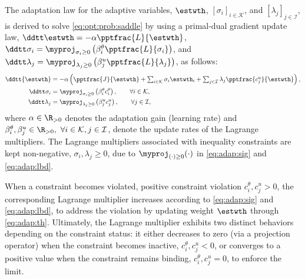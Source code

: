 \documentclass[letterpaper, journal]{IEEEtran}
\begin{document}
The adaptation law for the adaptive variables, $\estwth$, $[\sigma_i]_{i\in\mathcal{K}}$, and $[\lambda_j]_{j\in\mathcal{I}}$, is derived to solve \eqref{eq:opt:prob:saddle} by using a primal-dual gradient update law, \ie 
$
  \ddtt\estwth 
  = 
  -\alpha \pptfrac{L}{\estwth}
$, $
  \ddtt\sigma_i 
  = 
  \myproj_{\sigma_i\ge0}
  \left(
      \beta_i^\theta 
      \pptfrac{L}{\sigma_i}
  \right)
$, and $
  \ddtt\lambda_j 
  = 
  \myproj_{\lambda_j\ge0}
  \left(
    \beta_j^u 
    \pptfrac{L}{\lambda_j}
  \right)
$, as follows:
\begin{subequations} \label{eq:adap}
  \begin{align}
    \ddtt{\estwth}
    &
    =
    -\alpha 
    \left(
      \pptfrac{J}{\estwth}
      +
      \textstyle\sum_{i\in\mathcal{K}}
      \sigma_i 
      \estwth_i
      +
      \textstyle\sum_{j\in\mathcal{I}}
      \lambda_j 
      \pptfrac{c^{u}_{j}}{\estwth}
    \right),
    \label{eq:adap:th}
    \\
    \ddtt\sigma_i
    & 
    = 
    \myproj_{\sigma_i\ge0}
      \left(
      \beta_i^{\theta}
      c^{\theta}_{i} 
    \right)
    ,
    \qquad \forall i\in\mathcal{K},
    \label{eq:adap:sig}
    \\
    \ddtt\lambda_j
    & 
    = 
    \myproj_{\lambda_j\ge0}
      \left(
      \beta_j^{u}
      c^{u}_{j} 
    \right)
    ,
    \qquad \forall j\in\mathcal{I},
    \label{eq:adap:lbd}
  \end{align}%
\end{subequations}
where $\alpha\in\R_{>0}$ denotes the adaptation gain (learning rate) and $\beta_i^{\theta},\beta_j^{u}\in\R_{>0},\ \forall i\in\mathcal{K},j\in\mathcal{I}$, denote the update rates of the Lagrange multipliers. 
The Lagrange multipliers associated with inequality constraints are kept non-negative, \ie $\sigma_i,\lambda_j\ge 0$, due to $\myproj_{(\cdot)\ge0}(\cdot)$ in \eqref{eq:adap:sig} and \eqref{eq:adap:lbd}.

When a constraint becomes violated, \ie positive constraint violation $c^{\theta}_{i},c^{u}_{j}>0$, the corresponding Lagrange multiplier increases according to \eqref{eq:adap:sig} and \eqref{eq:adap:lbd}, to address the violation by updating weight $\estwth$ through \eqref{eq:adap:th}.
Ultimately, the Lagrange multiplier exhibits two distinct behaviors depending on the constraint status: it either decreases to zero (\eg via a projection operator) when the constraint becomes inactive, $c^{\theta}_i,c^{u}_j < 0$, or converges to a positive value when the constraint remains binding, $c^{\theta}_i,c^{u}_j = 0$, to enforce the limit.
\end{document}
